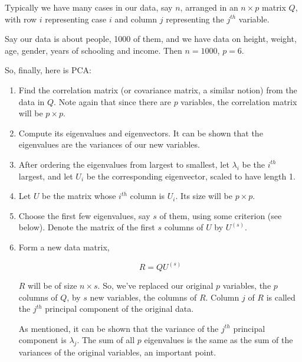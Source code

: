 Typically we have many cases in our data, say $n$, arranged in an $n
\times p$ matrix $Q$, with row $i$ representing case $i$ and column $j$
representing the $j^{th}$ variable.

Say our data is about people, 1000 of them, and we have data on height,
weight, age, gender, years of schooling and income.  Then $n = 1000$, $p
= 6$.

So, finally, here is PCA:

\begin{enumerate}


\item Find the correlation matrix (or covariance matrix, a similar
notion) from the data in $Q$.  Note again that since there are $p$
variables, the correlation matrix will be $p \times p$.

\item Compute its eigenvalues and eigenvectors.  It can be shown that
the eigenvalues are the variances of our new variables.

\item After ordering the eigenvalues from largest to smallest, let
$\lambda_i$ be the $i^{th}$ largest, and let $U_i$ be the corresponding
eigenvector, scaled to have length 1.  

\item Let $U$ be the matrix whose $i^{th}$ column is $U_i$.  Its size
will be $p \times p$.

\item Choose the first few eigenvalues, say $s$ of them, using some
criterion (see below).  Denote the matrix of the first $s$ columns of $U$
by $U^{(s)}$.  

\item Form a new data matrix, 

\begin{equation}
\label{rqu}
R = Q U^{(s)}
\end{equation}

$R$ will be of size $n \times s$.  So, we've replaced our original $p$
variables, the $p$ columns of $Q$, by $s$ new variables, the columns of
$R$.  Column $j$ of $R$ is called the $j^{th}$ principal component of
the original data.  

As mentioned, it can be shown that the variance of the $j^{th}$ principal
component is $\lambda_j$.  The sum of all $p$ eigenvalues is the same as
the sum of the variances of the original variables, an important point.

\end{enumerate} 

